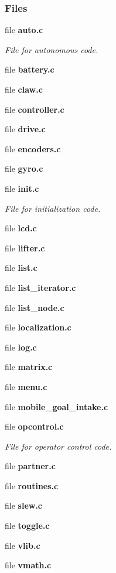 \subsubsection*{Files}
\begin{DoxyCompactItemize}
\item 
file \textbf{ auto.\+c}
\begin{DoxyCompactList}\small\item\em File for autonomous code. \end{DoxyCompactList}\item 
file \textbf{ battery.\+c}
\item 
file \textbf{ claw.\+c}
\item 
file \textbf{ controller.\+c}
\item 
file \textbf{ drive.\+c}
\item 
file \textbf{ encoders.\+c}
\item 
file \textbf{ gyro.\+c}
\item 
file \textbf{ init.\+c}
\begin{DoxyCompactList}\small\item\em File for initialization code. \end{DoxyCompactList}\item 
file \textbf{ lcd.\+c}
\item 
file \textbf{ lifter.\+c}
\item 
file \textbf{ list.\+c}
\item 
file \textbf{ list\+\_\+iterator.\+c}
\item 
file \textbf{ list\+\_\+node.\+c}
\item 
file \textbf{ localization.\+c}
\item 
file \textbf{ log.\+c}
\item 
file \textbf{ matrix.\+c}
\item 
file \textbf{ menu.\+c}
\item 
file \textbf{ mobile\+\_\+goal\+\_\+intake.\+c}
\item 
file \textbf{ opcontrol.\+c}
\begin{DoxyCompactList}\small\item\em File for operator control code. \end{DoxyCompactList}\item 
file \textbf{ partner.\+c}
\item 
file \textbf{ routines.\+c}
\item 
file \textbf{ slew.\+c}
\item 
file \textbf{ toggle.\+c}
\item 
file \textbf{ vlib.\+c}
\item 
file \textbf{ vmath.\+c}
\end{DoxyCompactItemize}
